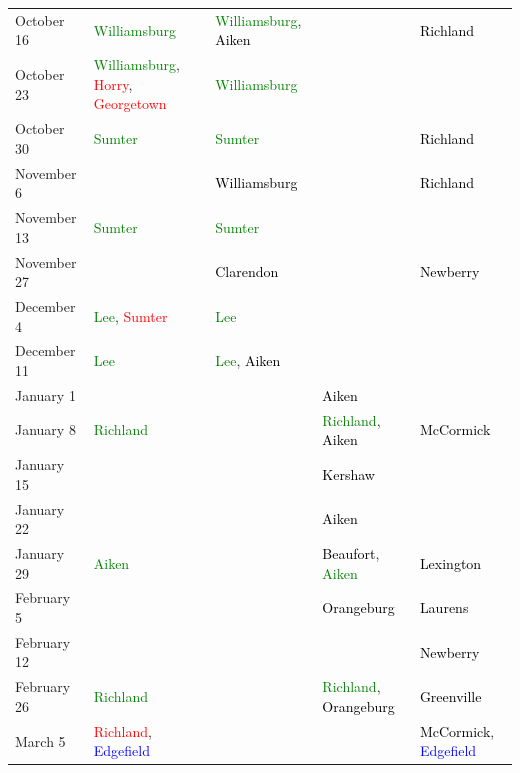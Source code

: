 \documentclass[11pt, oneside]{article}   	%
\theoremstyle{ModifiedStyle}
\begin{document}
\begin{table}[H]
{\begin{tabular}{L{23mm}C{55mm}C{38mm}C{38mm}C{38mm}}
    			\rule{0pt}{2.3ex} October 16 &  \textcolor{green}{Williamsburg} & \textcolor{green}{Williamsburg}, \textcolor{black}{Aiken} & &  \textcolor{black}{Richland}\\
    			\rule{0pt}{2.3ex} October 23 &  \textcolor{green}{Williamsburg}, \textcolor{red}{Horry}, \textcolor{red}{Georgetown} & \textcolor{green}{Williamsburg} & &\\
    			\rule{0pt}{2.3ex} October 30 &  \textcolor{green}{Sumter} & \textcolor{green}{Sumter} & &  \textcolor{black}{Richland}\\
    			\rule{0pt}{2.3ex} November 6 & & \textcolor{black}{Williamsburg} & &  \textcolor{black}{Richland}\\\rule{0pt}{2.3ex} November 13 &  \textcolor{green}{Sumter} & \textcolor{green}{Sumter} & &\\
    			\rule{0pt}{2.3ex} November 27 & & \textcolor{black}{Clarendon} & &  \textcolor{black}{Newberry}\\
    			\rule{0pt}{2.3ex} December 4 &  \textcolor{green}{Lee}, \textcolor{red}{Sumter} & \textcolor{green}{Lee} & &\\
    			\rule{0pt}{2.3ex} December 11 &  \textcolor{green}{Lee} & \textcolor{green}{Lee}, \textcolor{black}{Aiken} & &\\
    			\rule{0pt}{2.3ex} January 1 & & & \textcolor{black}{Aiken} &\\
    			\rule{0pt}{2.3ex} January 8 &  \textcolor{green}{Richland} & & \textcolor{green}{Richland}, \textcolor{black}{Aiken} &  \textcolor{black}{McCormick}\\
    			\rule{0pt}{2.3ex} January 15 & & & \textcolor{black}{Kershaw} &\\
    			\rule{0pt}{2.3ex} January 22 & & & \textcolor{black}{Aiken} &\\
    			\rule{0pt}{2.3ex} January 29 &  \textcolor{green}{Aiken} & & \textcolor{black}{Beaufort}, \textcolor{green}{Aiken} &  \textcolor{black}{Lexington}\\
    			\rule{0pt}{2.3ex} February 5 & & & \textcolor{black}{Orangeburg} &  \textcolor{black}{Laurens}\\
    			\rule{0pt}{2.3ex} February 12 & & & &  \textcolor{black}{Newberry}\\
    			\rule{0pt}{2.3ex} February 26 &  \textcolor{green}{Richland} & & \textcolor{green}{Richland}, \textcolor{black}{Orangeburg} &  \textcolor{black}{Greenville}\\
    			\rule{0pt}{2.3ex} March 5 &  \textcolor{red}{Richland}, \textcolor{blue}{Edgefield} & & &  \textcolor{black}{McCormick}, \textcolor{blue}{Edgefield}\\

\end{tabular}}
\end{table}
\end{document}

